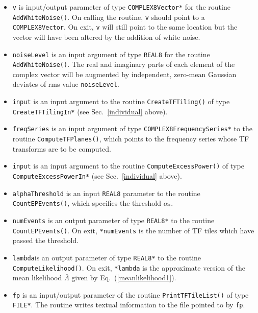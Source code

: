 \documentclass{article}
\begin{document}
\begin{itemize}
\begin{itemize}
\end{itemize}






\item \texttt{v} is input/output parameter of type
\verb+COMPLEX8Vector*+ for the routine \verb+AddWhiteNoise()+.  On
calling the routine, \verb+v+ should point to a \verb+COMPLEX8Vector+.
On exit, \verb+v+ will still point to the same location but the vector
will have been altered by the addition of white noise.

\item \texttt{noiseLevel} is an input argument of type \verb+REAL8+
for the routine \verb+AddWhiteNoise()+.  The real and imaginary parts
of each element of the complex vector will be augmented by
independent, zero-mean Gaussian deviates of rms value \verb+noiseLevel+.


\item \texttt{input} is an input argument to the routine
\verb+CreateTFTiling()+ of type \verb+CreateTFTilingIn*+ (see Sec.\
\ref{individual} above).

\item \texttt{freqSeries} is an input argument of type
\verb+COMPLEX8FrequencySeries*+ to the routine
\verb+ComputeTFPlanes()+, which points to the frequency series whose
TF transforms are to be computed.

\item \texttt{input} is an input argument to the routine
\verb+ComputeExcessPower()+ of type \verb+ComputeExcessPowerIn*+ (see Sec.\
\ref{individual} above).

\item \texttt{alphaThreshold} is an input \verb+REAL8+ parameter to
the routine \verb+CountEPEvents()+, which specifies the threshold
$\alpha_*$.  

\item \texttt{numEvents} is an output parameter of type \verb+REAL8*+ to
the routine \verb+CountEPEvents()+.  On exit, \verb+*numEvents+ is the
number of TF tiles which have passed the threshold.

\item \texttt{lambda}is an output parameter of type \verb+REAL8*+ to
the routine \verb+ComputeLikelihood()+.  On exit, \verb+*lambda+ is the
approximate version of the mean likelihood ${\bar \Lambda}$ given by
Eq.\ (\ref{meanlikelihood1}).
 
\item \texttt{fp} is an input/output parameter of the
routine \verb+PrintTFTileList()+ of type \verb+FILE*+.  The routine
writes textual information to the file pointed to by \verb+fp+.

\end{itemize}
\end{document}
